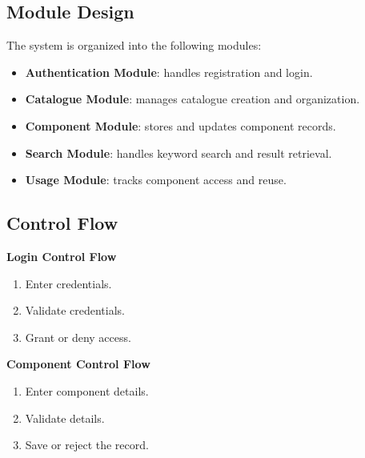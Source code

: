 \documentclass[12pt]{article}
\begin{document}
\begin{center}
\end{center}

\subsection{Module Design}
The system is organized into the following modules:
\begin{itemize}[leftmargin=1.2cm]
    \item \textbf{Authentication Module}: handles registration and login.
    \item \textbf{Catalogue Module}: manages catalogue creation and organization.
    \item \textbf{Component Module}: stores and updates component records.
    \item \textbf{Search Module}: handles keyword search and result retrieval.
    \item \textbf{Usage Module}: tracks component access and reuse.
\end{itemize}

\subsection{Control Flow}
\textbf{Login Control Flow}
\begin{enumerate}[leftmargin=1.2cm]
    \item Enter credentials.
    \item Validate credentials.
    \item Grant or deny access.
\end{enumerate}

\textbf{Component Control Flow}
\begin{enumerate}[leftmargin=1.2cm]
    \item Enter component details.
    \item Validate details.
    \item Save or reject the record.
\end{enumerate}
\end{document}
